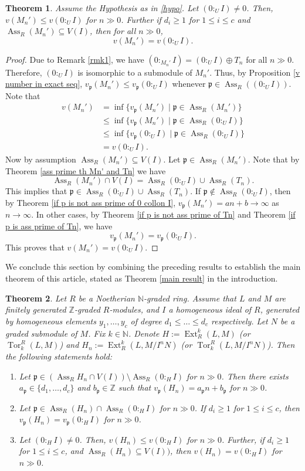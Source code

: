\documentclass[11pt,reqno]{amsart}
\newtheorem{theorem}{Theorem}[section]
\theoremstyle{definition}
\newcommand{\p}{\mathfrak{p}}
\newcommand{\Z}{\mathbb{Z}}
\newcommand{\N}{\mathbb{N}}
\newcommand{\Ass}{\operatorname{Ass}}
\newcommand{\Ext}{\operatorname{Ext}}
\newcommand{\Tor}{\operatorname{Tor}}
\begin{document}
\begin{theorem}\label{result on global v number}
Assume the Hypothesis as in \ref{hypo}. Let $(0:_UI)\neq 0$. Then, $v(M_n')\leq v(0:_UI)$ for $n\gg 0$. Further if $d_i\geq 1$ for $1\leq i\leq c$ and $\Ass_R (M_n')\subseteq V(I)$, then for all $n\gg0$, $$v(M_n')= v(0:_UI).$$
\end{theorem}
\begin{proof}
Due to Remark \ref{rmk1}, we have $(0 :_{M_n'} I)=(0:_UI)\oplus T_n$ for all $n\gg0$. Therefore, $(0:_UI)$ is isomorphic to a submodule of $M_n'$. Thus, by Proposition \ref{v number in exact seq}, $v_{\p}(M_n')\leq v_{\p}(0:_UI)$ whenever $\p\in \Ass_R ((0:_UI))$. 
Note that \begin{align*}
  v(M_n')&=\inf\{v_{\p}(M_n')\mid \p\in \Ass_R (M_n')\}\\ &\leq \inf\{v_{\p}(M_n')\mid \p\in \Ass_R (0:_UI)\}\\ &\leq \inf\{v_{\p}(0:_UI)\mid \p\in \Ass_R (0:_UI)\}\\&= v(0:_UI).
\end{align*} 
Now by assumption $\Ass_R (M_n')\subseteq V(I)$. Let $\p\in \Ass_R (M_n')$. Note that by Theorem \ref{ass prime th Mn' and Tn} we have $$\Ass_R (M_n')\cap V(I)=\Ass_R (0:_U I)\cup\Ass_R (T_n).$$ 
This implies that $\p\in \Ass_R (0:_U I)\cup\Ass_R (T_n).$ If $\p\notin \Ass_R (0:_U I)$, then by Theorem \ref{if p is not ass prime of 0 collon I}, $v_{\p}(M_n')=an+b\to \infty$ as $n\to \infty$. In other cases, by Theorem \ref{if p is not ass prime of Tn} and Theorem \ref{if p is ass prime of Tn}, we have $$v_{\p}(M_n')= v_{\p}(0:_UI).$$ This proves that $v(M_n')= v(0:_UI).$
\end{proof}
We conclude this section by combining the preceding results to establish the main theorem of this article, stated as Theorem \ref{main result} in the introduction.
\begin{theorem}\label{proof of main result}
   Let $R$ be a Noetherian $\N$-graded ring. Assume that $L$ and  $M$ are finitely generated $\Z$-graded $R$-modules, and $I$ a homogeneous ideal of $R$,  generated by homogeneous elements $y_1,\ldots,y_c$ of degree $d_1\leq\ldots\leq d_c$ respectively. Let $N$ be a graded submodule of $M$. Fix $k\in \N$. Denote $H:=\Ext^k_R(L,M)$ (or $\Tor_k^R(L,M)$) and $H_n:=\Ext^k_R(L, M/I^nN)$ (or $\Tor_k^R(L,M/I^nN)$). Then the following statements hold:
   \begin{enumerate}[label=(\arabic*), font=\upshape]
       \item  Let $\p\in \left(\Ass_R H_n\cap V(I)\right)\setminus \Ass_R(0:_HI)$ for $n\gg 0$. Then there exists $a_\p\in\{d_1,\ldots,d_c\}$ and $b_\p\in \Z$ such that $v_{\p}(H_n)=a_\p n+b_\p$ for $n\gg 0$.
       \item  Let $\p\in \Ass_R(H_n)\cap \Ass_R(0:_HI)$ for $n\gg 0$. If $d_i\geq 1$ for $1\leq i\leq c$, then $v_{\p}(H_n)=v_{\p}(0:_HI)$ for $n\gg 0$.
       \item Let $(0:_HI)\neq 0$. Then, $v(H_n)\leq v(0:_HI)$ for $n\gg 0$. Further, if $d_i\geq 1$ for $1\leq i\leq c$, and $\Ass_R(H_n)\subseteq V(I))$, then $v(H_n)= v(0:_HI)$ for $n\gg 0$. 
   \end{enumerate}
\end{theorem}
\end{document}
